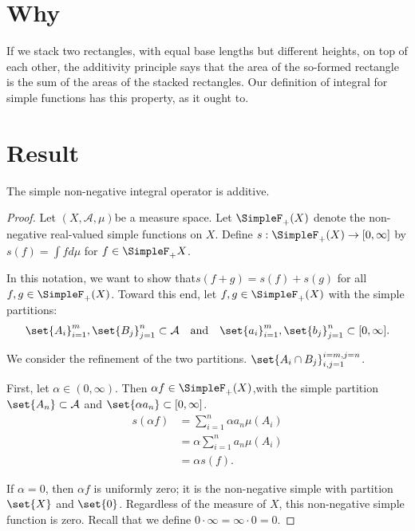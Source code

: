
\section*{Why}

If we stack two rectangles, with equal base lengths but different heights, on top of each other, the additivity principle says that the area of the so-formed rectangle is the sum of the areas of the stacked rectangles.
Our definition of integral for simple functions has this property, as it ought to.

\section*{Result}

\begin{proposition}
The simple non-negative integral operator is additive.
\end{proposition}

\begin{proof}Let $(X, \mathcal{A} , \mu )$be a measure space.
Let $\SimpleF_+(X)$ denote the non-negative real-valued simple functions on $X$.
Define $s: \SimpleF_+(X) \to [0, \infty]$ by $s(f) = \int f d\mu $ for $f \in \SimpleF_+{X}$.

In this notation, we want to show that$s(f+g) = s(f) + s(g)$ for all $f, g \in \SimpleF_+(X)$.
Toward this end, let $f,g \in \SimpleF_+(X)$ with the simple partitions:
\[
\set{A_i}_{i = 1}^{m},\set{B_j}_{j = 1}^{n} \subset \mathcal{A} \quad \text{and} \quad\set{a_i}_{i = 1}^{m},\set{b_j}_{j = 1}^{n} \subset [0, \infty].
\]

We consider the refinement of the two partitions.
$\set{A_i \cap  B_j}_{i, j = 1}^{i = m, j = n}$.

%      


First, let $\alpha  \in (0, \infty)$.
Then $\alpha  f \in \SimpleF_+(X)$,with the simple partition$\set{A_n} \subset \mathcal{A} $ and $\set{\alpha  a_n} \subset [0, \infty]$.
\[
\begin{aligned}
s(\alpha  f) &= \sum_{i = 1}^{n} \alpha  a_n \mu (A_i) \\
&= \alpha  \sum_{i = 1}^{n} a_n \mu (A_i) \\
&= \alpha  s(f).
\end{aligned}
\]

If $\alpha  = 0$, then $\alpha  f$ is uniformly zero; it is the non-negative simple with partition $\set{X}$ and $\set{0}$.
Regardless of the measure of $X$, this non-negative simple function is zero.
Recall that we define $0\cdot \infty = \infty\cdot 0 = 0$.\end{proof}